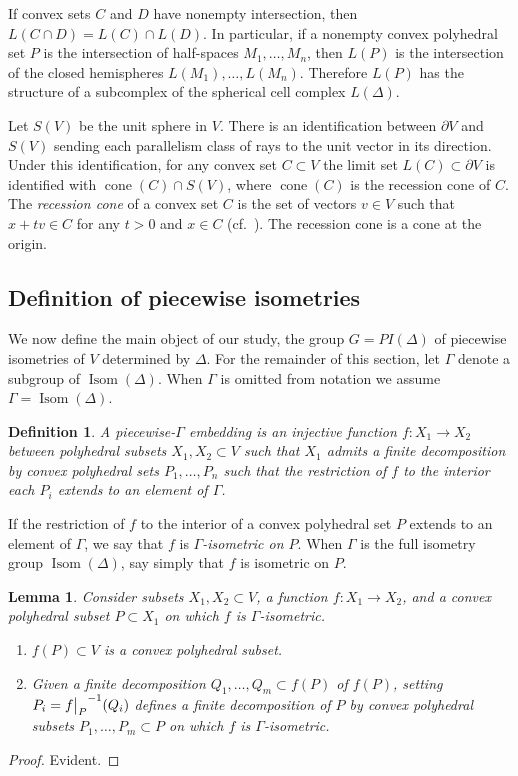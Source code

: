 \documentclass[11pt]{amsart}
\newtheorem{lemma}[theorem]{Lemma}
\newtheorem{definition}[theorem]{Definition}
\numberwithin{table}{section}
\numberwithin{figure}{section}
\theoremstyle{remark}
\DeclareMathOperator{\Isom}{Isom}
\DeclareMathOperator{\cone}{cone}
\newcommand\restr[2]{{%
  \left.\kern-\nulldelimiterspace %
  #1 %
  \vphantom{\big|} %
  \right|_{#2} %
  }}
\begin{document}
If convex sets $C$ and $D$ have nonempty intersection, then
$L(C\cap D) = L(C)\cap L(D)$. In particular, if a nonempty convex
polyhedral set $P$ is the intersection of half-spaces
$M_1,\dotsc, M_n$, then $L(P)$ is the intersection of the closed
hemispheres $L(M_1),\dotsc, L(M_n)$. Therefore $L(P)$ has the
structure of a subcomplex of the spherical cell complex $L(\Delta)$.

Let $S(V)$ be the unit sphere in $V$. There is an identification
between $\partial V$ and $S(V)$ sending each parallelism class of rays
to the unit vector in its direction. Under this identification, for
any convex set $C\subset V$ the limit set $L(C) \subset \partial V$ is
identified with $\cone(C)\cap S(V)$, where $\cone(C)$ is the recession
cone of $C$. The {\em recession cone} of a convex set $C$ is the set
of vectors $v\in V$ such that $x+tv\in C$ for any $t>0$ and $x\in C$
(cf.~\cite[1.5]{Zieg}). The recession cone is a cone at the origin.



\subsection{Definition of piecewise isometries}

We now define the main object of our study, the group $G = PI(\Delta)$
of piecewise isometries of $V$ determined by $\Delta$. For the
remainder of this section, let $\Gamma$ denote a subgroup of
$\Isom(\Delta)$. When $\Gamma$ is omitted from notation we assume
$\Gamma = \Isom(\Delta)$.

\begin{definition}
  A {\em piecewise-$\Gamma$ embedding} is an injective function
  $f:X_1 \to X_2$ between polyhedral subsets $X_1, X_2 \subset V$ such
  that $X_1$ admits a finite decomposition by convex polyhedral sets
  $P_1,\dotsc, P_n$ such that the restriction of $f$ to the interior
  each $P_i$ extends to an element of $\Gamma$.
\end{definition}

If the restriction of $f$ to the interior of a convex polyhedral set
$P$ extends to an element of $\Gamma$, we say that $f$ is
{\em $\Gamma$-isometric on $P$}. When $\Gamma$ is the full isometry
group $\Isom(\Delta)$, say simply that $f$ is isometric on $P$.

\begin{lemma}\label{lem:piecebasics}
  Consider subsets $X_1,X_2 \subset V$, a function
  $f : X_1 \to X_2$, and a convex polyhedral subset $P \subset X_1$ on
  which $f$ is $\Gamma$-isometric.
  \begin{enumerate}
  \item $f(P) \subset V$ is a convex polyhedral subset.
  \item Given a finite decomposition $Q_1,\dotsc, Q_m \subset f(P)$ of
    $f(P)$, setting \mbox{$P_i = \restr{f}{P}^{-1}(Q_i)$} defines a
    finite decomposition of $P$ by convex polyhedral subsets
    $P_1,\dotsc, P_m \subset P$ on which $f$ is $\Gamma$-isometric.
  \end{enumerate}
\end{lemma}
\begin{proof}
  Evident.
\end{proof}
\end{document}
